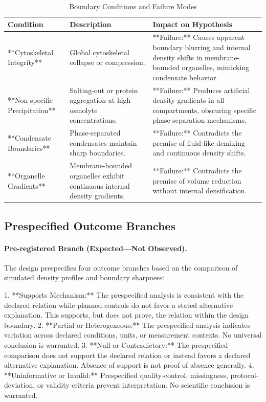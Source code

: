 \documentclass[conference]{IEEEtran}
\begin{document}
\begin{table}[htbp]
\centering
\footnotesize
\setlength{\tabcolsep}{3pt}
\renewcommand{\arraystretch}{1.12}
\caption{Boundary Conditions and Failure Modes}
\label{tab:study-design-and-methods-boundary-condition-matrix}
\begin{tabular}{|p{}|p{}|p{}|}
\hline
Condition & Description & Impact on Hypothesis \\\hline
**Cytoskeletal Integrity** & Global cytoskeletal collapse or compression. & **Failure:** Causes apparent boundary blurring and internal density shifts in membrane-bounded organelles, mimicking condensate behavior. \\\hline
**Non-specific Precipitation** & Salting-out or protein aggregation at high osmolyte concentrations. & **Failure:** Produces artificial density gradients in all compartments, obscuring specific phase-separation mechanisms. \\\hline
**Condensate Boundaries** & Phase-separated condensates maintain sharp boundaries. & **Failure:** Contradicts the premise of fluid-like demixing and continuous density shifts. \\\hline
**Organelle Gradients** & Membrane-bounded organelles exhibit continuous internal density gradients. & **Failure:** Contradicts the premise of volume reduction without internal densification. \\\hline
\end{tabular}
\end{table}

\subsection{Prespecified Outcome Branches}
\paragraph{Pre-registered Branch (Expected---Not Observed).} The design prespecifies four outcome branches based on the comparison of simulated density profiles and boundary sharpness:

1. **Supports Mechanism:** The prespecified analysis is consistent with the declared relation while planned controls do not favor a stated alternative explanation. This supports, but does not prove, the relation within the design boundary. 2. **Partial or Heterogeneous:** The prespecified analysis indicates variation across declared conditions, units, or measurement contexts. No universal conclusion is warranted. 3. **Null or Contradictory:** The prespecified comparison does not support the declared relation or instead favors a declared alternative explanation. Absence of support is not proof of absence generally. 4. **Uninformative or Invalid:** Prespecified quality-control, missingness, protocol-deviation, or validity criteria prevent interpretation. No scientific conclusion is warranted.
\end{document}
